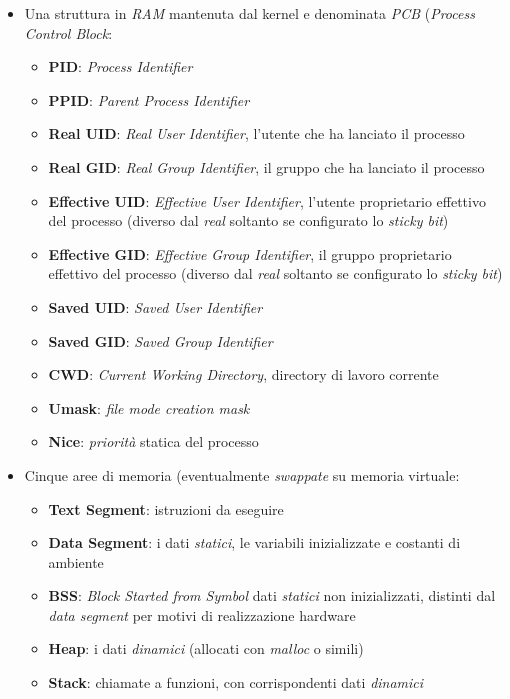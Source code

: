 \begin{itemize}
    \item Una struttura in \textit{RAM} mantenuta dal kernel e denominata \textit{PCB} (\textit{Process Control Block}:
    \begin{itemize}
        \item \textbf{PID}: \textit{Process Identifier}
        \item \textbf{PPID}: \textit{Parent Process Identifier}
        \item \textbf{Real UID}: \textit{Real User Identifier}, l'utente che ha lanciato il processo
        \item \textbf{Real GID}: \textit{Real Group Identifier}, il gruppo che ha lanciato il processo
        \item \textbf{Effective UID}: \textit{Effective User Identifier}, l'utente proprietario effettivo del processo (diverso dal \textit{real} soltanto se configurato lo \textit{sticky bit})
        \item \textbf{Effective GID}: \textit{Effective Group Identifier}, il gruppo proprietario effettivo del processo (diverso dal \textit{real} soltanto se configurato lo \textit{sticky bit})
        \item \textbf{Saved UID}: \textit{Saved User Identifier}
        \item \textbf{Saved GID}: \textit{Saved Group Identifier}
        \item \textbf{CWD}: \textit{Current Working Directory}, directory di lavoro corrente
        \item \textbf{Umask}: \textit{file mode creation mask}
        \item \textbf{Nice}: \textit{priorità} statica del processo
    \end{itemize}
    \item Cinque aree di memoria (eventualmente \textit{swappate} su memoria virtuale:
    \begin{itemize}
        \item \textbf{Text Segment}: istruzioni da eseguire
        \item \textbf{Data Segment}: i dati \textit{statici}, le variabili inizializzate e costanti di ambiente
        \item \textbf{BSS}: \textit{Block Started from Symbol} dati \textit{statici} non inizializzati, distinti dal \textit{data segment} per motivi di realizzazione hardware
        \item \textbf{Heap}: i dati \textit{dinamici} (allocati con \textit{malloc} o simili)
        \item \textbf{Stack}: chiamate a funzioni, con corrispondenti dati \textit{dinamici}
    \end{itemize}
\end{itemize}
